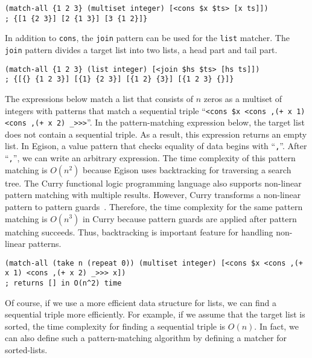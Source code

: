 \documentclass[acmlarge]{acmart}
\newcommand{\new}[1]{\textcolor{blue}{#1}}
\begin{document}
\begin{lstlisting}[language=egison]
(match-all {1 2 3} (multiset integer) [<cons $x $ts> [x ts]])
; {[1 {2 3}] [2 {1 3}] [3 {1 2}]}
\end{lstlisting}

In addition to \lstinline{cons}, the \lstinline{join} pattern can be used for the \lstinline{list} matcher.
The \lstinline{join} pattern divides a target list into two lists, a head part and tail part.

\begin{lstlisting}[language=egison]
(match-all {1 2 3} (list integer) [<join $hs $ts> [hs ts]])
; {[{} {1 2 3}] [{1} {2 3}] [{1 2} {3}] [{1 2 3} {}]}
\end{lstlisting}

The expressions below match a list that consists of $n$ zeros as a multiset of integers with patterns that match a sequential triple ``\lstinline{<cons $x <cons ,(+ x 1) <cons ,(+ x 2) _>>>}''.
In the pattern-matching expression below, the target list does not contain a sequential triple.
As a result, this expression returns an empty list.
In Egison, a value pattern that checks equality of data begins with ``\lstinline{,}''.
After ``\lstinline{,}'',  we can write an arbitrary expression.
The time complexity of this pattern matching is $O(n^2)$ because Egison uses backtracking for traversing a search tree.
The Curry functional logic programming language also supports non-linear pattern matching with multiple results.
However, Curry transforms a non-linear pattern to pattern guards~\cite{antoy2010programming,antoy2001constructor,hanus2007multi}.
Therefore, the time complexity for the same pattern matching is $O(n^3)$ in Curry because pattern guards are applied after pattern matching succeeds.
Thus, backtracking is important feature for handling non-linear patterns.

\begin{lstlisting}[language=egison]
(match-all (take n (repeat 0)) (multiset integer) [<cons $x <cons ,(+ x 1) <cons ,(+ x 2) _>>> x])
; returns [] in O(n^2) time
\end{lstlisting}

\noindent
Of course, if we use a more efficient data structure for lists, we can find a sequential triple more efficiently.
For example, if we assume that the target list is sorted, the time complexity for finding a sequential triple is $O(n)$.
In fact, we can also define such a pattern-matching algorithm by defining a matcher for sorted-lists.
\end{document}
